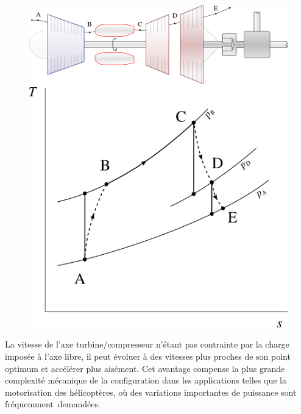 		\begin{figure}
			\begin{center}
				\includegraphics[scale=0.6]{images/circuit_turbine_libre.png}\vspace{0.5cm}
				\includegraphics[scale=0.6]{images/ts_gp_turbine_libre.png}
			\end{center}
			\label{fig_turbine_libre}
		\end{figure}

		La vitesse de l’axe turbine/compresseur n’étant pas contrainte par la charge imposée à l’axe libre, il peut évoluer à des vitesses plus proches de son point optimum et accélérer plus aisément. Cet avantage compense la plus grande complexité mécanique de la configuration dans les applications telles que la motorisation des hélicoptères, où des variations importantes de puissance sont fréquemment~\mbox{demandées}.

